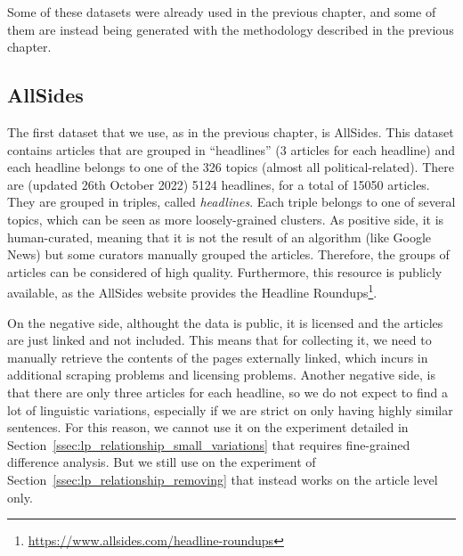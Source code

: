 Some of these datasets were already used in the previous chapter, and some of them are instead being generated with the methodology described in the previous chapter.



\subsection{AllSides}

The first dataset that we use, as in the previous chapter, is AllSides.
This dataset contains articles that are grouped in “headlines” (3 articles for each headline) and each headline belongs to one of the 326 topics (almost all political-related). There are (updated 26th October 2022) 5124 headlines, for a total of 15050 articles. They are grouped in triples, called \emph{headlines}. Each triple belongs to one of several topics, which can be seen as more loosely-grained clusters. 
As positive side, it is human-curated, meaning that it is not the result of an algorithm (like Google News) but some curators manually grouped the articles. Therefore, the groups of articles can be considered of high quality.
Furthermore, this resource is publicly available, as the AllSides website provides the Headline Roundups\footnote{\url{https://www.allsides.com/headline-roundups}}.

On the negative side, althought the data is public, it is licensed and the articles are just linked and not included.
This means that for collecting it, we need to manually retrieve the contents of the pages externally linked, which incurs in additional scraping problems and licensing problems.
Another negative side, is that there are only three articles for each headline, so we do not expect to find a lot of linguistic variations, especially if we are strict on only having highly similar sentences. For this reason, we cannot use it on the experiment detailed in Section~\ref{ssec:lp_relationship_small_variations} that requires fine-grained difference analysis. But we still use on the experiment of Section~\ref{ssec:lp_relationship_removing} that instead works on the article level only.

